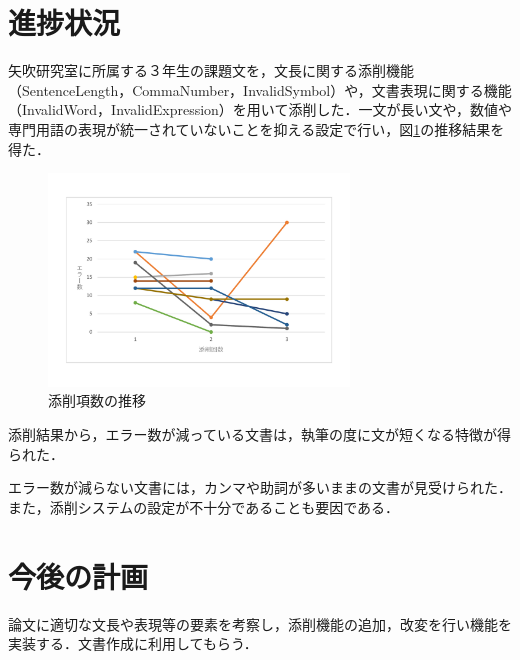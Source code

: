\documentclass[uplatex,twocolumn,dvipdfmx]{jsarticle}
\begin{document}
\section{進捗状況}
矢吹研究室に所属する３年生の課題文を，文長に関する添削機能（SentenceLength，CommaNumber，InvalidSymbol）や，文書表現に関する機能（InvalidWord，InvalidExpression）を用いて添削した．一文が長い文や，数値や専門用語の表現が統一されていないことを抑える設定で行い，図\ref{conf}の推移結果を得た．

\begin{figure}[h]
\centering
\includegraphics[width=8cm,clip]{images.pdf}
\caption{添削項数の推移}\label{conf}
\end{figure}

添削結果から，エラー数が減っている文書は，執筆の度に文が短くなる特徴が得られた．

エラー数が減らない文書には，カンマや助詞が多いままの文書が見受けられた．また，添削システムの設定が不十分であることも要因である．



\section{今後の計画}
論文に適切な文長や表現等の要素を考察し，添削機能の追加，改変を行い機能を実装する．文書作成に利用してもらう．



\end{document}

